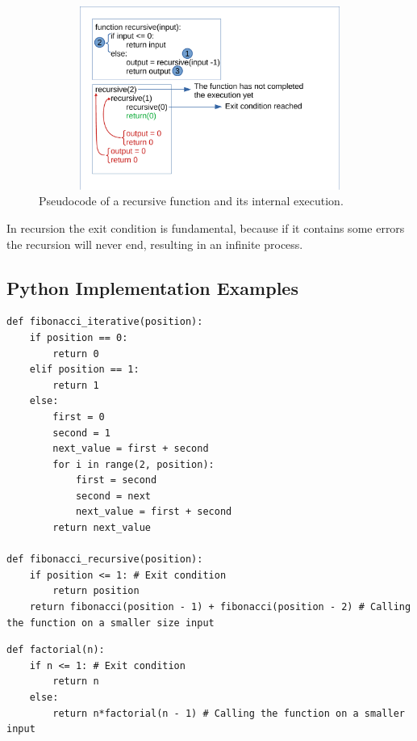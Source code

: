 \begin{figure}[hb]
	\includegraphics[width=14cm,height=6cm]{chapters/introduction/images/recursion_1.pdf}
	\caption[]{Pseudocode of a recursive function and its internal execution.}
	\label{recursion_1}
\end{figure}

In recursion the exit condition is fundamental, because if it contains some errors the recursion will never end, resulting in an infinite process.

\newpage
\subsection{Python Implementation Examples}

\begin{lstlisting}[caption={Implementation of the Fibonacci series with both iterative and recursive way.}]
def fibonacci_iterative(position):
	if position == 0:
		return 0
	elif position == 1:
		return 1
	else:
		first = 0
		second = 1
		next_value = first + second
		for i in range(2, position):
			first = second
			second = next
			next_value = first + second
		return next_value

def fibonacci_recursive(position):
	if position <= 1: # Exit condition
		return position
	return fibonacci(position - 1) + fibonacci(position - 2) # Calling the function on a smaller size input
\end{lstlisting}

\begin{lstlisting}[caption={Implementation of calculating the factorial of a number using the recursive way.}]
def factorial(n):
	if n <= 1: # Exit condition
		return n
	else: 
		return n*factorial(n - 1) # Calling the function on a smaller input
\end{lstlisting}